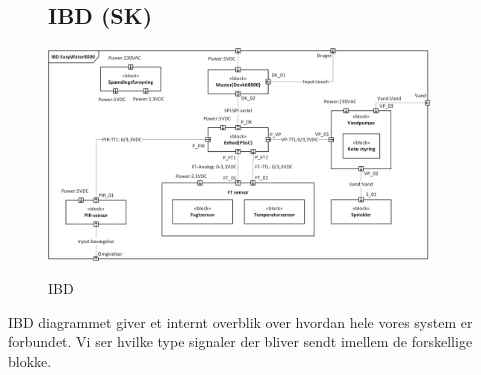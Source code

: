 \begin{figure}[H] \centering
\subsection{IBD (SK)}
{\includegraphics[width=0.9\textwidth]{filer/systemarkitektur/IBD}}
\caption{IBD}
\label{lab:ibd}
\raggedright
\end{figure}
IBD diagrammet giver et internt overblik over hvordan hele vores system er forbundet. Vi ser hvilke type signaler der bliver sendt imellem de forskellige blokke.
